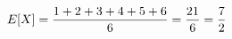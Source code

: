 \documentclass[preview]{standalone}
\begin{document}
\begin{align*}
\special{dvisvgm:raw <g id='unique000'>}E[X]=\dfrac{1+2+3+4+5+6}{6}=\dfrac{21}{6}=\dfrac{7}{2}\special{dvisvgm:raw </g>}
\end{align*}
\end{document}
